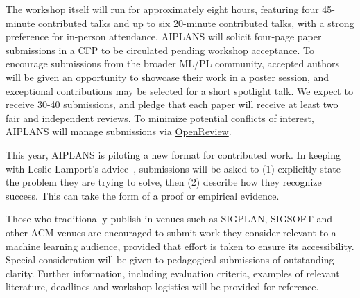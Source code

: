 \documentclass{article}
\begin{document}
%


The workshop itself will run for approximately eight hours, featuring four 45-minute contributed talks and up to six 20-minute contributed talks, with a strong preference for in-person attendance. AIPLANS will solicit four-page paper submissions in a CFP to be circulated pending workshop acceptance. To encourage submissions from the broader ML/PL community, accepted authors will be given an opportunity to showcase their work in a poster session, and exceptional contributions may be selected for a short spotlight talk. We expect to receive 30-40 submissions, and pledge that each paper will receive at least two fair and independent reviews. To minimize potential conflicts of interest, AIPLANS will manage submissions via \href{https://openreview.net}{OpenReview}.

This year, AIPLANS is piloting a new format for contributed work. In keeping with Leslie Lamport's advice~\cite{lamport1978state}, submissions will be asked to (1) explicitly state the problem they are trying to solve, then (2) describe how they recognize success. This can take the form of a proof or empirical evidence.


Those who traditionally publish in venues such as SIGPLAN, SIGSOFT and other ACM venues are encouraged to submit work they consider relevant to a machine learning audience, provided that effort is taken to ensure its accessibility. Special consideration will be given to pedagogical submissions of outstanding clarity. Further information, including evaluation criteria, examples of relevant literature, deadlines and workshop logistics will be provided for reference.
\end{document}
